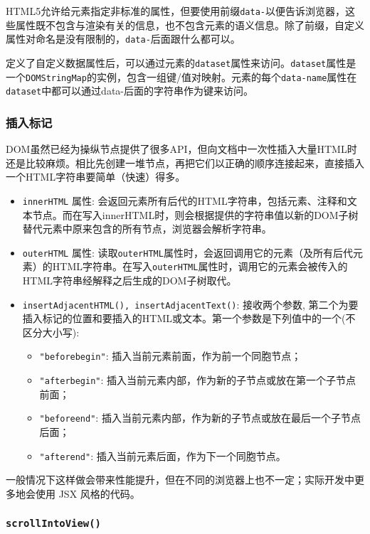 HTML5允许给元素指定非标准的属性，但要使用前缀\texttt{data-}以便告诉浏览器，这些属性既不包含与渲染有关的信息，也不包含元素的语义信息。除了前缀，自定义属性对命名是没有限制的，\texttt{data-}后面跟什么都可以。

定义了自定义数据属性后，可以通过元素的\texttt{dataset}属性来访问。\texttt{dataset}属性是一个\texttt{DOMStringMap}的实例，包含一组键/值对映射。元素的每个\texttt{data-name}属性在\texttt{dataset}中都可以通过data-后面的字符串作为键来访问。

\subsubsection*{插入标记}

DOM虽然已经为操纵节点提供了很多API，但向文档中一次性插入大量HTML时还是比较麻烦。相比先创建一堆节点，再把它们以正确的顺序连接起来，直接插入一个HTML字符串要简单（快速）得多。

\begin{itemize}
    \item \texttt{innerHTML} 属性: 会返回元素所有后代的HTML字符串，包括元素、注释和文本节点。而在写入innerHTML时，则会根据提供的字符串值以新的DOM子树替代元素中原来包含的所有节点，浏览器会解析字符串。
    \item \texttt{outerHTML} 属性: 读取\texttt{outerHTML}属性时，会返回调用它的元素（及所有后代元素）的HTML字符串。在写入\texttt{outerHTML}属性时，调用它的元素会被传入的HTML字符串经解释之后生成的DOM子树取代。
    \item \texttt{insertAdjacentHTML(), insertAdjacentText()}: 接收两个参数, 第二个为要插入标记的位置和要插入的HTML或文本。第一个参数是下列值中的一个(不区分大小写):
    \begin{itemize}
        \item \texttt{"beforebegin"}: 插入当前元素前面，作为前一个同胞节点；
        \item \texttt{"afterbegin"}: 插入当前元素内部，作为新的子节点或放在第一个子节点前面；
        \item \texttt{"beforeend"}: 插入当前元素内部，作为新的子节点或放在最后一个子节点后面；
        \item \texttt{"afterend"}: 插入当前元素后面，作为下一个同胞节点。
    \end{itemize}
\end{itemize}

一般情况下这样做会带来性能提升，但在不同的浏览器上也不一定；实际开发中更多地会使用 JSX 风格的代码。

\subsubsection*{\texttt{scrollIntoView()}}

